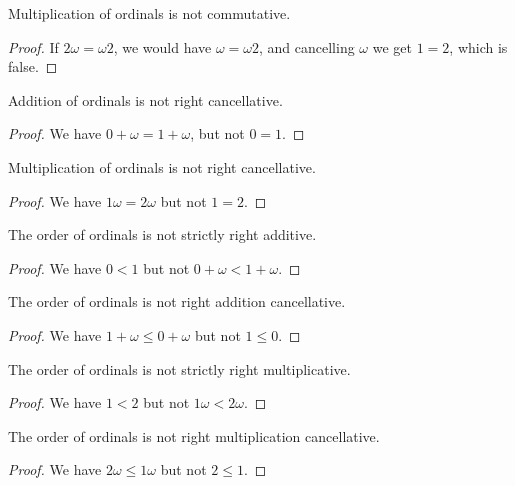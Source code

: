 \documentclass[../../math.tex]{subfiles}
\begin{document}
\begin{theorem}
    Multiplication of ordinals is not commutative.
\end{theorem}
\begin{proof}
    If $2 \omega = \omega 2$, we would have $\omega = \omega 2$, and
    cancelling $\omega$ we get $1 = 2$, which is false.
\end{proof}

\begin{theorem}
    Addition of ordinals is not right cancellative.
\end{theorem}
\begin{proof}
    We have $0 + \omega = 1 + \omega$, but not $0 = 1$.
\end{proof}

\begin{theorem}
    Multiplication of ordinals is not right cancellative.
\end{theorem}
\begin{proof}
    We have $1\omega = 2\omega$ but not $1 = 2$.
\end{proof}

\begin{theorem}
    The order of ordinals is not strictly right additive.
\end{theorem}
\begin{proof}
    We have $0 < 1$ but not $0 + \omega < 1 + \omega$.
\end{proof}

\begin{theorem}
    The order of ordinals is not right addition cancellative.
\end{theorem}
\begin{proof}
    We have $1 + \omega \leq 0 + \omega$ but not $1 \leq 0$.
\end{proof}

\begin{theorem}
    The order of ordinals is not strictly right multiplicative.
\end{theorem}
\begin{proof}
    We have $1 < 2$ but not $1 \omega < 2 \omega$.
\end{proof}

\begin{theorem}
    The order of ordinals is not right multiplication cancellative.
\end{theorem}
\begin{proof}
    We have $2 \omega \leq 1 \omega$ but not $2 \leq 1$.
\end{proof}
\end{document}
